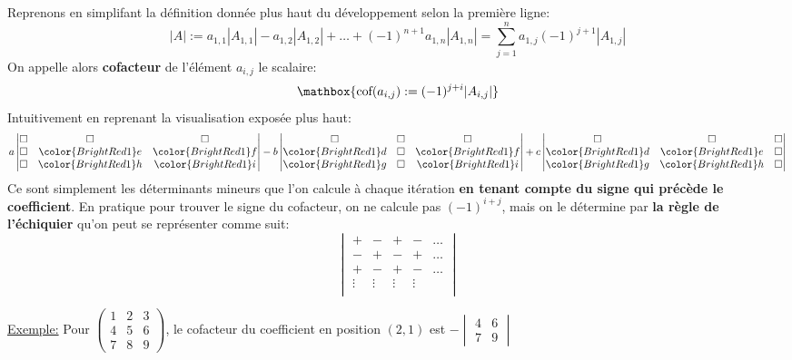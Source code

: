 Reprenons en simplifant la définition donnée plus haut du développement selon la première ligne:
\[
   |A| := a_{1, 1}|A_{1, 1}| - a_{1, 2}|A_{1, 2}| + \ldots + (-1)^{n+1}a_{1, n}|A_{1, n}| = \sum_{j=1}^{n}a_{1, j}(-1)^{j+1}|A_{1, j}|
\]
On appelle alors \textbf{cofacteur} de l'élément \(a_{i, j}\) le scalaire:
\[
   \mathbox{\text{cof}(a_{i, j}) : =(-1)^{j+i}|A_{i, j}|}   
\]
Intuitivement en reprenant la visualisation exposée plus haut:
\[
   a \begin{vmatrix} \square & \square & \square \\ \square & \color{BrightRed1}e & \color{BrightRed1}f \\ \square & \color{BrightRed1}h & \color{BrightRed1}i \end{vmatrix} - 
   b \begin{vmatrix} \square & \square & \square \\ \color{BrightRed1}d & \square & \color{BrightRed1}f \\ \color{BrightRed1}g & \square & \color{BrightRed1}i \end{vmatrix} + 
   c \begin{vmatrix} \square & \square & \square \\ \color{BrightRed1}d & \color{BrightRed1}e & \square \\ \color{BrightRed1}g & \color{BrightRed1}h & \square \end{vmatrix}  
\]
Ce sont simplement les déterminants mineurs que l'on calcule à chaque itération \textbf{en tenant compte du signe qui précède le coefficient}.\+
En pratique pour trouver le signe du cofacteur, on ne calcule pas \((-1)^{i + j}\), mais on le détermine par \textbf{la règle de l'échiquier} qu'on peut se représenter comme suit:
\[
   \begin{vmatrix} + & - & + & - & \ldots \\ - & + & - & + &\ldots \\ + & - & + & - &\ldots \\ \vdots & \vdots & \vdots & \vdots \\\end{vmatrix}
\]

\underline{Exemple:} Pour \(\begin{pmatrix}
   1 & 2 & 3 \\ 4 & 5 & 6 \\ 7 & 8 & 9
\end{pmatrix}\), le cofacteur du coefficient en position \((2, 1)\) est 
\(- \begin{vmatrix} 4 & 6 \\ 7 & 9\end{vmatrix} \)

